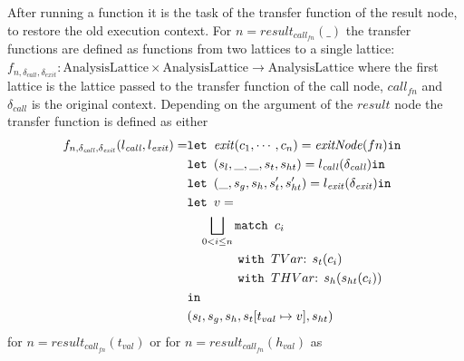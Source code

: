After running a function it is the task of the transfer function of the result node, to restore the old execution context.  For $n = \mathit{result}_{\mathit{call}_{fn}}(\_)$ the transfer functions are defined as functions from two lattices to a single lattice: $f_{n,\delta_{\mathit{call}},\delta_{\mathit{exit}}}: \text{AnalysisLattice} \times \text{AnalysisLattice} \rightarrow \text{AnalysisLattice}$ where the first lattice is the lattice passed to the transfer function of the call node, ${\mathit{call}_{fn}}$ and $\delta_{\mathit{call}}$ is the original context. Depending on the argument of the $\mathit{result}$ node the transfer function is defined as either
\begin{align}
f_{n,\delta_{\mathit{call}}, \delta_{\mathit{exit}}}(l_{\mathit{call}}, l_{\mathit{exit}})=   &\texttt{let } \mathit{exit}(c_1, \cdots, c_n) = \mathit{exitNode}(fn) \texttt{in }\notag\\
                                                &\texttt{let } (s_l, \_, \_, s_t, s_{ht}) = l_{\mathit{call}}(\delta_{\mathit{call}}) \texttt{in }\notag\\
                                                &\texttt{let } (\_, s_g, s_h, s_t', s_{ht}') = l_{\mathit{exit}}(\delta_{\mathit{exit}}) \texttt{in }\notag\\
                                                &\texttt{let } v = \notag\\
                                                &\quad \bigsqcup_{0<i \leq n} \texttt{match }c_i\notag\\
                                                &\quad\quad\quad\quad \texttt{with }TVar\text{: } s_t(c_i)\notag\\
                                                &\quad\quad\quad\quad \texttt{with }THVar\text{: } s_h(s_{ht}(c_i))\notag\\
                                                & \texttt{in }\notag\\
                                                &(s_l,s_g,s_h, s_t[t_{val}\mapsto v], s_{ht})
\end{align}
for $n = \mathit{result}_{\mathit{call}_{fn}}(t_{val})$ or for $n = \mathit{result}_{\mathit{call}_{fn}}(h_{val})$ as 
